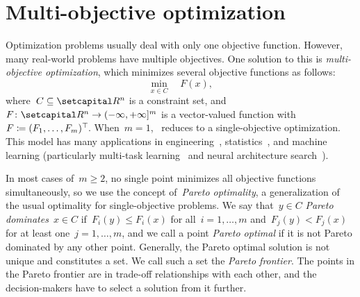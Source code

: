 \documentclass[../../main]{subfiles}
\begin{document}
\section{Multi-objective optimization} 
Optimization problems usually deal with only one objective function.
However, many real-world problems have multiple objectives.
One solution to this is \emph{multi-objective optimization}, which minimizes several objective functions as follows:
\begin{equation} \label{eq:MOO}
    \min_{x \in C} \quad F(x)
,\end{equation} 
where~$C \subseteq \setR^n$ is a constraint set, and $F \colon \setR^n \to (-\infty, +\infty]^m$ is a vector-valued function with~$F \coloneqq (F_1, \dots, F_m)^\top\hspace{-1pt}$.
When~$m = 1$,~ reduces to a single-objective optimization.
This model has many applications in engineering~\cite{Eschenauer1990}, statistics~\cite{Carrizosa1998}, and machine learning (particularly multi-task learning~\cite{Sener2018,Lin2019} and neural architecture search~\cite{Kim2017,Dong2018,Elsken2019}).

In most cases of~$m \ge 2$, no single point minimizes all objective functions simultaneously, so we use the concept of~\emph{Pareto optimality}, a generalization of the usual optimality for single-objective problems.
We say that~$y \in C$ \emph{Pareto dominates}~$x \in C$ if~$F_i(y) \le F_i(x)$ for all~$i = 1, \dots, m$ and~$F_j(y) < F_j(x)$ for at least one~$j = 1, \dots, m$, and we call a point \emph{Pareto optimal} if it is not Pareto dominated by any other point.
Generally, the Pareto optimal solution is not unique and constitutes a set.
We call such a set the \emph{Pareto frontier}.
The points in the Pareto frontier are in trade-off relationships with each other, and the decision-makers have to select a solution from it further.






\end{document}
